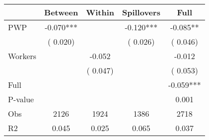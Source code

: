 
\begin{tabular}{l*{4}{c}}\hline&\multicolumn{1}{c}{Between}&\multicolumn{1}{c}{Within}&\multicolumn{1}{c}{Spillovers}&\multicolumn{1}{c}{Full}\\ \hline
 PWP           &             -0.070***      &                                               &       -0.120*** &        -0.085**                            \\ 
                               &        (       0.020)           &                                       &       (       0.026)     &      (       0.046)                                           \\ 
 Workers       &                                               &       -0.052    &                                &            -0.012                            \\ 
                               &                                               & (       0.047)                  &                                        &      (       0.053)                                           \\ 
\hline                                                                                                                                                                                                                                            
 Full                  &                                               &                                               &                                        &            -0.059***                                     \\ 
 P-value               &                                               &                                               &                                        &             0.001                                           \\ 
 Obs                   &               2126               &       1924                       &       1386                &              2718                                               \\ 
 R2                    &                      0.045              &              0.025                      &              0.065               &                     0.037                                              \\ 
\hline \end{tabular}                                                                                                                                                                                                              